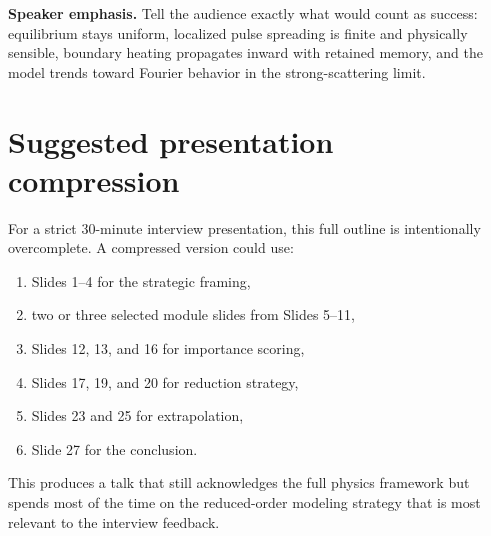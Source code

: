 \documentclass[11pt]{article}
\begin{document}
\textbf{Speaker emphasis.} Tell the audience exactly what would count as success: equilibrium stays uniform, localized pulse spreading is finite and physically sensible, boundary heating propagates inward with retained memory, and the model trends toward Fourier behavior in the strong-scattering limit.


\section{Suggested presentation compression}
For a strict 30-minute interview presentation, this full outline is intentionally overcomplete. A compressed version could use:
\begin{enumerate}[leftmargin=1.6em]
    \item Slides 1--4 for the strategic framing,
    \item two or three selected module slides from Slides 5--11,
    \item Slides 12, 13, and 16 for importance scoring,
    \item Slides 17, 19, and 20 for reduction strategy,
    \item Slides 23 and 25 for extrapolation,
    \item Slide 27 for the conclusion.
\end{enumerate}
This produces a talk that still acknowledges the full physics framework but spends most of the time on the reduced-order modeling strategy that is most relevant to the interview feedback.
\end{document}

